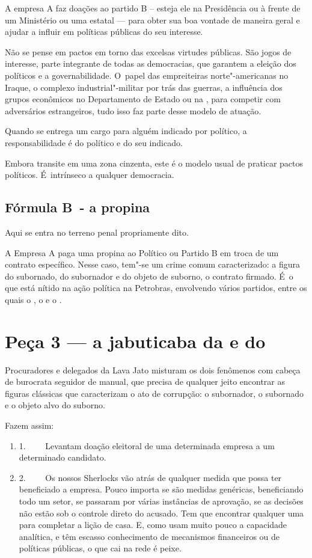 A empresa A faz doações ao partido B -- esteja ele na Presidência ou à
frente de um Ministério ou uma estatal --- para obter sua boa vontade de
maneira geral e ajudar a influir em políticas públicas do seu interesse.

Não se pense em pactos em torno das excelsas virtudes públicas. São
jogos de interesse, parte integrante de todas as democracias, que
garantem a eleição dos políticos e a governabilidade. O~papel das
empreiteiras norte"-americanas no Iraque, o complexo industrial"-militar
por trás das guerras, a influência dos grupos econômicos no Departamento
de Estado ou na , para competir com adversários estrangeiros, tudo
isso faz parte desse modelo de atuação.

Quando se entrega um cargo para alguém indicado por político, a
responsabilidade é do político e do seu indicado.

Embora transite em uma zona cinzenta, este é o modelo usual de praticar
pactos políticos. É~intrínseco a qualquer democracia.

\subsection{\textbf{Fórmula B}~- a propina}

Aqui se entra no terreno penal propriamente dito.

A Empresa A paga uma propina ao Político ou Partido B em troca de um
contrato específico. Nesse caso, tem"-se um crime comum caracterizado: a
figura do subornado, do subornador e do objeto de suborno, o contrato
firmado. É~o que está nítido na ação política na Petrobras, envolvendo
vários partidos, entre os quais o , o  e o .

\section{Peça 3 --- a jabuticaba da  e do }

Procuradores e delegados da Lava Jato misturam os dois fenômenos com
cabeça de burocrata seguidor de manual, que precisa de qualquer jeito
encontrar as figuras clássicas que caracterizam o ato de corrupção: o
subornador, o subornado e o objeto alvo do suborno.

Fazem assim:

\begin{enumerate}
\itemsep1pt\parskip0pt
\item
  1.~~~~ Levantam doação eleitoral de uma determinada empresa a um
  determinado candidato.
\item
  2.~~~~ Os nossos Sherlocks vão atrás de qualquer medida que possa ter
  beneficiado a empresa. Pouco importa se são medidas genéricas,
  beneficiando todo um setor, se passaram por várias instâncias de
  aprovação, se as decisões não estão sob o controle direto do acusado.
  Tem que encontrar qualquer uma para completar a lição de casa. E, como
  usam muito pouco a capacidade analítica, e têm escasso conhecimento de
  mecanismos financeiros ou de políticas públicas, o que cai na rede é
  peixe.
\end{enumerate}

